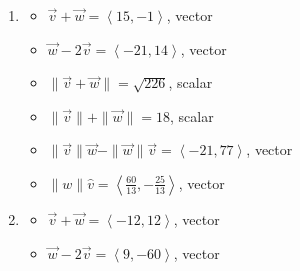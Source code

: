 \begin{enumerate}

\item  

\begin{multicols}{2}

\begin{itemize}

\item  $\vec{v} + \vec{w} = \left<15,-1 \right> $, vector
\item  $\vec{w}  - 2\vec{v}  = \left<-21,14 \right>$, vector

\end{itemize}

\end{multicols}

\begin{multicols}{2}

\begin{itemize}

\item $\| \vec{v} + \vec{w} \| = \sqrt{226}$, scalar
\item  $\| \vec{v} \| + \| \vec{w}\| = 18$, scalar

\end{itemize}

\end{multicols}

\begin{multicols}{2}

\begin{itemize}

\item $\| \vec{v} \| \vec{w} - \| \vec{w} \| \vec{v}  = \left<-21,77\right>$, vector
\item $\|w\| \hat{v}= \left<\frac{60}{13}, -\frac{25}{13} \right>$, vector

\end{itemize}

\end{multicols}

\item  

\begin{multicols}{2}

\begin{itemize}

\item  $\vec{v} + \vec{w} = \left<-12,12 \right> $, vector
\item  $\vec{w}  - 2\vec{v}  = \left<9,-60 \right>$, vector


\end{itemize}
\end{multicols}
\end{enumerate}
